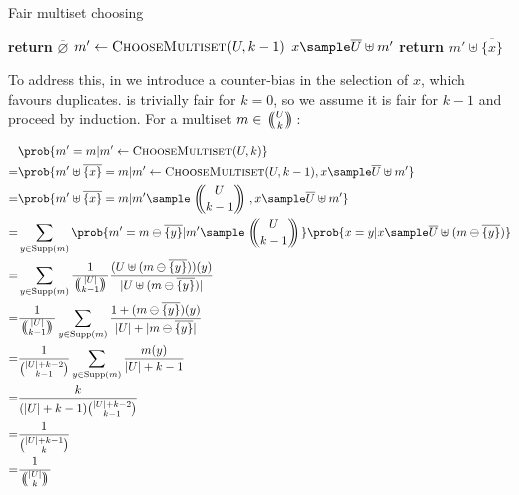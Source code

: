 \documentclass[letterpaper,luatex,11pt]{article}
\newcommand{\multichoose}[2]{
\left.\mathchoice
  {\left(\kern-0.48em\binom{#1}{#2}\kern-0.48em\right)}
  {\big(\kern-0.30em\binom{\smash{#1}}{\smash{#2}}\kern-0.30em\big)}
  {\left(\kern-0.30em\binom{\smash{#1}}{\smash{#2}}\kern-0.30em\right)}
  {\left(\kern-0.30em\binom{\smash{#1}}{\smash{#2}}\kern-0.30em\right)}
\right.}
\DeclareMathOperator{\Supp}{Supp}
\begin{document}


\begin{algorithm}
\caption{Fair multiset choosing}
\begin{algorithmic}[0]
        \State \textbf{return} $\overline{\varnothing}$
    \Else
        \State $m' \leftarrow \textproc{ChooseMultiset}(U, k-1)$
        \State $x \sample \overline{U} \uplus m'$
        \State \textbf{return} $m' \uplus \overline{\{x\}}$
    \EndIf
\EndProcedure
\end{algorithmic}
\end{algorithm}

To address this, in  we introduce a
counter-bias in the selection of $x$, which favours duplicates.
 is trivially fair for $k = 0$, so we assume
it is fair for $k - 1$ and proceed by induction. For a multiset $m \in
\multichoose{U}{k}$:

\begin{align*}
    &\prob{m' = m | m' \leftarrow \textproc{ChooseMultiset}(U, k)}
    \\
    =&
    \prob{m' \uplus \overline{\{x\}} = m
        | m' \leftarrow \textproc{ChooseMultiset}(U, k-1), x \sample \overline{U} \uplus m'}
    \\
    =&
    \prob{m' \uplus \overline{\{x\}} = m
        | m' \sample \multichoose{U}{k - 1}, x \sample \overline{U} \uplus m'}
    \\
    =&
    \sum_{y \in \Supp(m)}
    \prob{m' = m \ominus \overline{\{y\}} | m' \sample \multichoose{U}{k - 1}}
    \prob{x = y | x \sample \overline{U} \uplus (m \ominus \overline{\{y\}})}
    \\
    =&
    \sum_{y \in \Supp(m)}
    \frac{1}{\multichoose{|U|}{k - 1}}
    \frac{(U \uplus (m \ominus \overline{\{y\}}))(y)}{|U \uplus (m \ominus \overline{\{y\}})|}
    \\
    =&
    \frac{1}{\multichoose{|U|}{k - 1}}
    \sum_{y \in \Supp(m)}
    \frac{1 + (m \ominus \overline{\{y\}})(y)}{|U| + |m \ominus \overline{\{y\}}|}
    \\
    =&
    \frac{1}{\binom{|U| + k - 2}{k-1}}
    \sum_{y \in \Supp(m)}
    \frac{m(y)}{|U| + k -1}
    \\
    =& \frac{k}{(|U| + k -1)\binom{|U| + k - 2}{k-1}}
    \\
    =& \frac{1}{\binom{|U| + k - 1}{k}}
    \\
    =& \frac{1}{\multichoose{|U|}{k}}
\end{align*}
\end{document}
